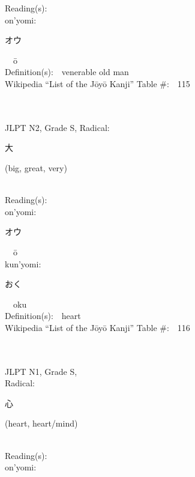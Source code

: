 \begin{multicols}{2}
Reading(s):\ \ \\
{\hspace*{1em}}on'yomi:\ \ \\
{\hspace*{2em}}{\begin{CJK}{UTF8}{min} オウ \end{CJK}}\ \ \=o\ \ \\
Definition(s):\ \ venerable old man \\
Wikipedia ``List of the J\=oy\=o Kanji'' Table \#:\ \ 115 \\
\ \ \\
{\fontsize{34pt}{40pt}  }\ \ \\  %
{JLPT N2, Grade S, Radical:\ \ {\begin{CJK}{UTF8}{min} 大 \end{CJK}} (big, great, very) } \\
Reading(s):\ \ \\
{\hspace*{1em}}on'yomi:\ \ \\
{\hspace*{2em}}{\begin{CJK}{UTF8}{min} オウ \end{CJK}}\ \ \=o\ \ \\
{\hspace*{1em}}kun'yomi:\ \ \\
{\hspace*{2em}}{\begin{CJK}{UTF8}{min} おく \end{CJK}}\ \ oku\ \ \\
Definition(s):\ \ heart \\
Wikipedia ``List of the J\=oy\=o Kanji'' Table \#:\ \ 116 \\
\ \ \\
{\fontsize{34pt}{40pt}  }\ \ \\
{JLPT N1, Grade S, \\Radical:\ \ {\begin{CJK}{UTF8}{min} 心 \end{CJK}} (heart, heart/mind) } \\
Reading(s):\ \ \\
{\hspace*{1em}}on'yomi:\ \ \\

\end{multicols}

